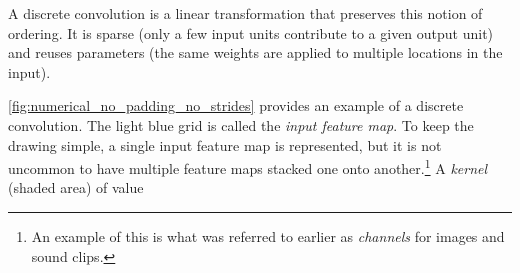 A discrete convolution is a linear transformation that preserves this notion of
ordering. It is sparse (only a few input units contribute to a given output
unit) and reuses parameters (the same weights are applied to multiple locations
in the input).

\autoref{fig:numerical_no_padding_no_strides} provides an example of a discrete
convolution. The light blue grid is called the {\em input feature map}. To keep
the drawing simple, a single input feature map is represented, but it is not
uncommon to have multiple feature maps stacked one onto another.\footnote{%
    An example of this is what was referred to earlier as {\em channels\/} for
    images and sound clips.}
A {\em kernel\/} (shaded area) of value

\begin{figure}[H]
    \centering
\end{figure}

